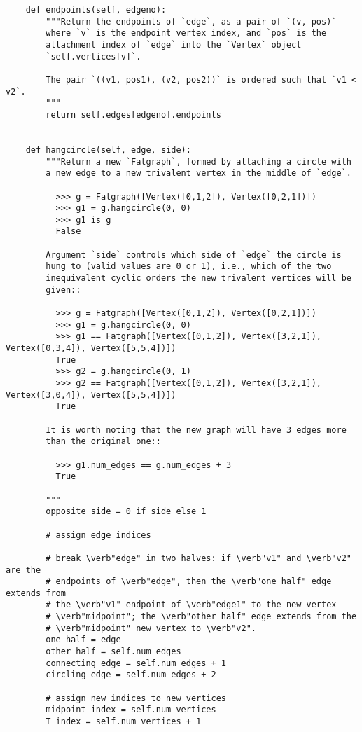 \begin{lstlisting}
    def endpoints(self, edgeno):
        """Return the endpoints of `edge`, as a pair of `(v, pos)`
        where `v` is the endpoint vertex index, and `pos` is the
        attachment index of `edge` into the `Vertex` object
        `self.vertices[v]`.

        The pair `((v1, pos1), (v2, pos2))` is ordered such that `v1 < v2`.
        """
        return self.edges[edgeno].endpoints


    def hangcircle(self, edge, side):
        """Return a new `Fatgraph`, formed by attaching a circle with
        a new edge to a new trivalent vertex in the middle of `edge`.

          >>> g = Fatgraph([Vertex([0,1,2]), Vertex([0,2,1])])
          >>> g1 = g.hangcircle(0, 0)
          >>> g1 is g
          False
          
        Argument `side` controls which side of `edge` the circle is
        hung to (valid values are 0 or 1), i.e., which of the two
        inequivalent cyclic orders the new trivalent vertices will be
        given::
        
          >>> g = Fatgraph([Vertex([0,1,2]), Vertex([0,2,1])])
          >>> g1 = g.hangcircle(0, 0)
          >>> g1 == Fatgraph([Vertex([0,1,2]), Vertex([3,2,1]), Vertex([0,3,4]), Vertex([5,5,4])])
          True
          >>> g2 = g.hangcircle(0, 1)
          >>> g2 == Fatgraph([Vertex([0,1,2]), Vertex([3,2,1]), Vertex([3,0,4]), Vertex([5,5,4])])
          True

        It is worth noting that the new graph will have 3 edges more
        than the original one::

          >>> g1.num_edges == g.num_edges + 3
          True
          
        """
        opposite_side = 0 if side else 1

        # assign edge indices
        
        # break \verb"edge" in two halves: if \verb"v1" and \verb"v2" are the
        # endpoints of \verb"edge", then the \verb"one_half" edge extends from
        # the \verb"v1" endpoint of \verb"edge1" to the new vertex
        # \verb"midpoint"; the \verb"other_half" edge extends from the
        # \verb"midpoint" new vertex to \verb"v2".
        one_half = edge
        other_half = self.num_edges
        connecting_edge = self.num_edges + 1
        circling_edge = self.num_edges + 2
        
        # assign new indices to new vertices
        midpoint_index = self.num_vertices
        T_index = self.num_vertices + 1


\end{lstlisting}
